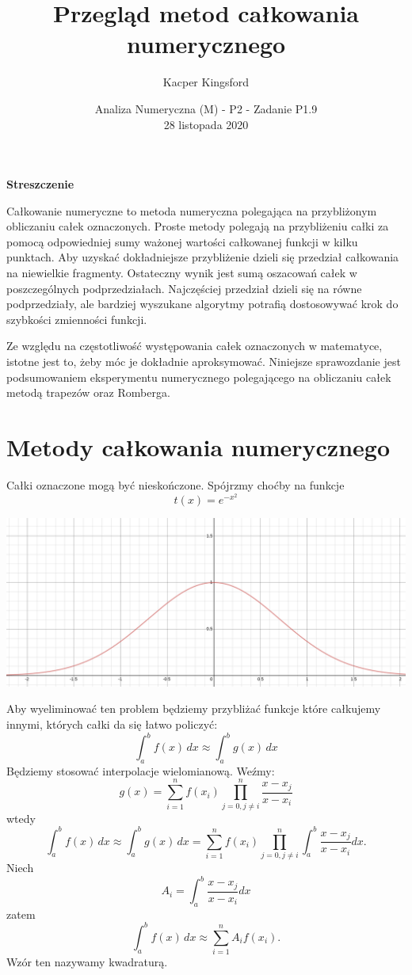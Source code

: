 \documentclass[12p]{article}
\title{\huge Przegląd metod całkowania numerycznego}
\date{Analiza Numeryczna (M) - P2 - Zadanie P1.9\\ 28 listopada 2020}
\author{\Large Kacper Kingsford}
\begin{document}
\begin{titlepage}

\maketitle
\thispagestyle{empty}
\begin{center}
	\textbf{\large Streszczenie}
\end{center}
\par Całkowanie numeryczne to metoda numeryczna polegająca na przybliżonym obliczaniu całek oznaczonych. Proste metody polegają na przybliżeniu całki za pomocą odpowiedniej sumy ważonej wartości całkowanej funkcji w kilku punktach. Aby uzyskać dokładniejsze przybliżenie dzieli się przedział całkowania na niewielkie fragmenty. Ostateczny wynik jest sumą oszacowań całek w poszczególnych podprzedziałach. Najczęściej przedział dzieli się na równe podprzedziały, ale bardziej wyszukane algorytmy potrafią dostosowywać krok do szybkości zmienności funkcji. 
\par Ze względu na częstotliwość występowania całek oznaczonych w matematyce, istotne jest to, żeby móc je dokładnie aproksymować. Niniejsze sprawozdanie jest podsumowaniem eksperymentu numerycznego polegającego na obliczaniu całek  metodą trapezów oraz Romberga.


\end{titlepage}

\newpage

\tableofcontents

\newpage

\section{Metody całkowania numerycznego}
Całki oznaczone mogą być nieskończone. Spójrzmy choćby na funkcje
\[ t(x) = e^{-x^2}\]
\begin{center}
\includegraphics[scale=0.3]{img3.png}
\end{center}
Aby wyeliminować ten problem będziemy przybliżać funkcje które całkujemy innymi, których całki da się łatwo policzyć: 
\[ \int_{a}^{b} f(x) \,dx  \approx \int_{a}^{b} g(x) \,dx \]
Będziemy stosować interpolacje wielomianową. Weźmy:
\[ g(x) = \sum_{i=1}^{n} f(x_{i})\prod_{j=0, j \neq i
}^{n} \frac{x-x_{j}}{x-x_{i}}  \]
wtedy
\[ \int_{a}^{b} f(x) \,dx  \approx \int_{a}^{b} g(x) \,dx = \sum_{i=1}^{n} f(x_{i})\prod_{j=0, j \neq i
}^{n} \int_{a}^{b}  \frac{x-x_{j}}{x-x_{i}}dx .\]
Niech
\[ A_{i} = \int_{a}^{b}  \frac{x-x_{j}}{x-x_{i}}dx\]
zatem
\[ \int_{a}^{b} f(x) \,dx  \approx \sum_{i=1}^{n} A_{i}f(x_{i}).\]
Wzór ten nazywamy kwadraturą.
\end{document}
